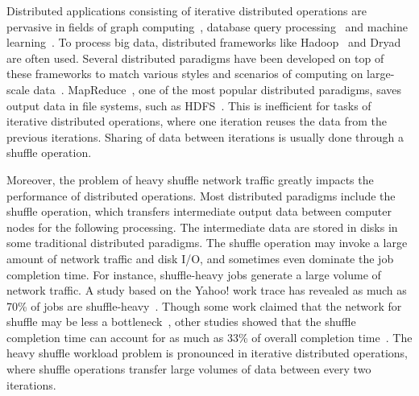 \documentclass[10pt,journal,compsoc]{IEEEtran}
\begin{document}


Distributed applications consisting of iterative distributed operations are pervasive in fields of graph computing~\cite{Malewicz:2010:PSL, Lu:2014:LDG}, database query processing~\cite{thusoo2009hive,Yu:2008:DSG,Armbrust:2015:SSR} and machine learning~\cite{low2012distributed,kraska2013mlbase}.
To process big data,
distributed frameworks like Hadoop~\cite{dean2008mapreduce}%
and Dryad~\cite{isard2007dryad} are often used.
Several distributed paradigms have been developed on top of
these frameworks to match various styles and
scenarios of computing on large-scale data~\cite{thusoo2009hive, Yu:2008:DSG}.
MapReduce~\cite{dean2008mapreduce}, one of the most popular
distributed paradigms, 
saves output data in file systems, such as HDFS~\cite{shvachko2010hadoop}. 
This is inefficient for tasks of iterative distributed operations, where one iteration reuses the data from the previous iterations. Sharing of data between iterations is usually done
through a shuffle operation.

Moreover, the problem of heavy shuffle network traffic greatly impacts the performance of distributed operations. 
Most distributed paradigms include the shuffle
operation, which transfers intermediate output data between computer nodes 
for the following processing.
The intermediate data are stored in disks in some traditional distributed paradigms. 
The shuffle operation may invoke a large amount of network traffic and disk I/O, 
and sometimes even dominate the job completion time. 
For instance, 
shuffle-heavy jobs generate a large volume of network traffic. 
A study based on the Yahoo! work trace has revealed as much as 70\% of 
jobs are shuffle-heavy~\cite{chen2011case}. 
Though some work claimed that the network for shuffle may
be less a bottleneck~\cite{Ousterhout2015MSP},
other studies showed that the shuffle completion
time can account for as much as 33\% of overall completion time~\cite{chowdhury2011managing, al2010hedera}.
The heavy shuffle workload problem is pronounced in iterative distributed operations, 
where shuffle operations transfer large volumes of data between every two iterations. 
\end{document}
